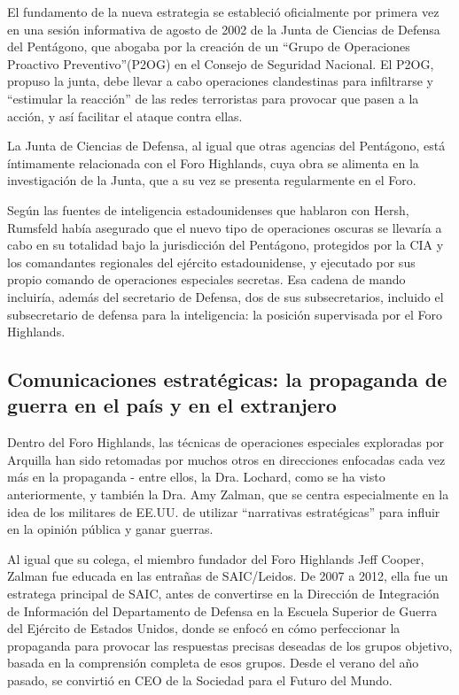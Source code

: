 \documentclass[10pt,a5paper,twoside,spanish,]{book}
\begin{document}
El fundamento de la nueva estrategia se estableció oficialmente por
primera vez en una sesión informativa de agosto de 2002 de la Junta de
Ciencias de Defensa del Pentágono, que abogaba por la creación de un
``Grupo de Operaciones Proactivo Preventivo''(P2OG) en el Consejo de
Seguridad Nacional. El P2OG, propuso la junta, debe llevar a cabo
operaciones clandestinas para infiltrarse y ``estimular la reacción'' de
las redes terroristas para provocar que pasen a la acción, y así
facilitar el ataque contra ellas.

La Junta de Ciencias de Defensa, al igual que otras agencias del
Pentágono, está íntimamente relacionada con el Foro Highlands, cuya obra
se alimenta en la investigación de la Junta, que a su vez se presenta
regularmente en el Foro.

Según las fuentes de inteligencia estadounidenses que hablaron con
Hersh, Rumsfeld había asegurado que el nuevo tipo de operaciones oscuras
se llevaría a cabo en su totalidad bajo la jurisdicción del Pentágono,
protegidos por la CIA y los comandantes regionales del ejército
estadounidense, y ejecutado por sus propio comando de operaciones
especiales secretas. Esa cadena de mando incluiría, además del
secretario de Defensa, dos de sus subsecretarios, incluido el
subsecretario de defensa para la inteligencia: la posición supervisada
por el Foro Highlands.

\subsection{Comunicaciones estratégicas: la propaganda de guerra en el
país y en el
extranjero}\label{comunicaciones-estratuxe9gicas-la-propaganda-de-guerra-en-el-pauxeds-y-en-el-extranjero}

Dentro del Foro Highlands, las técnicas de operaciones especiales
exploradas por Arquilla han sido retomadas por muchos otros en
direcciones enfocadas cada vez más en la propaganda - entre ellos, la
Dra. Lochard, como se ha visto anteriormente, y también la Dra. Amy
Zalman, que se centra especialmente en la idea de los militares de
EE.UU. de utilizar ``narrativas estratégicas'' para influir en la
opinión pública y ganar guerras.

Al igual que su colega, el miembro fundador del Foro Highlands Jeff
Cooper, Zalman fue educada en las entrañas de SAIC/Leidos. De 2007 a
2012, ella fue un estratega principal de SAIC, antes de convertirse en
la Dirección de Integración de Información del Departamento de Defensa
en la Escuela Superior de Guerra del Ejército de Estados Unidos, donde
se enfocó en cómo perfeccionar la propaganda para provocar las
respuestas precisas deseadas de los grupos objetivo, basada en la
comprensión completa de esos grupos. Desde el verano del año pasado, se
convirtió en CEO de la Sociedad para el Futuro del Mundo.
\end{document}
